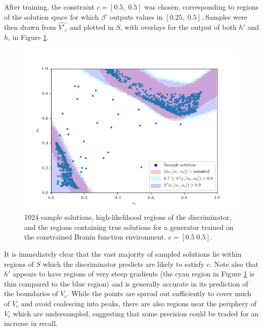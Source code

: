 \documentclass[../../main.tex]{subfiles}
\begin{document}
After training, the constraint $c=[0.5,\;0.5]$ was chosen, corresponding to regions of the solution space for which $\beta'$ outputs values in $[0.25,\;0.5]$.
Samples were then drawn from $\hat{V'_c}$ and plotted in $S$, with overlays for the output of both $h'$ and $h$, in Figure \ref{fig:equality05}.
\begin{figure}[H]
    \begin{center}
    \includegraphics[width=\textwidth]{equality05}
    \caption{
        1024 sample solutions, high-likelihood regions of the discriminator, and the regions containing true solutions for a generator trained on the constrained Branin function environment.
        $c=[0.5\;0.5]$.
    }
    \label{fig:equality05}
    \end{center}
\end{figure}
It is immediately clear that the vast majority of sampled solutions lie within regions of $S$ which the discriminator predicts are likely to satisfy $c$.
Note also that $h'$ appears to have regions of very steep gradients (the cyan region in Figure \ref{fig:equality05} is thin compared to the blue region) and is generally accurate in its prediction of the boundaries of $V_c$.
While the points are spread out sufficiently to cover much of $V_c$ and avoid coalescing into peaks, there are also regions near the periphery of $V_c$ which are undersampled, suggesting that some precision could be traded for an increase in recall.
\end{document}
